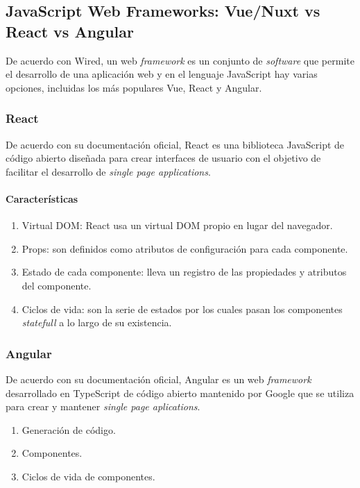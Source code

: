 \subsection{JavaScript Web Frameworks: Vue/Nuxt vs React vs Angular}

De acuerdo con Wired\cite{wired_wired_2020}, un web \textit{framework} es un conjunto de \textit{software} que permite el desarrollo de una aplicación web y en el lenguaje JavaScript hay varias opciones, incluidas los más populares Vue, React y Angular.

\subsubsection*{React}
De acuerdo con su documentación oficial\cite{react_react_2020}, React es una biblioteca JavaScript de código abierto diseñada para crear interfaces de usuario con el objetivo de facilitar el desarrollo de \textit{single page applications}.

\paragraph*{Características}
\begin{enumerate}
    \item Virtual DOM: React usa un virtual DOM propio en lugar del navegador.
    \item Props: son definidos como atributos de configuración para cada componente.
    \item Estado de cada componente: lleva un registro de las propiedades y atributos del componente.
    \item Ciclos de vida: son la serie de estados por los cuales pasan los componentes \textit{statefull} a lo largo de su existencia. 
\end{enumerate}

\subsubsection*{Angular}
De acuerdo con su documentación oficial\cite{angular_angular_2020}, Angular es un web \textit{framework} desarrollado en TypeScript de código abierto mantenido por Google que se utiliza para crear y mantener \textit{single page aplications}. 

\begin{enumerate}
    \item Generación de código.
    \item Componentes.
    \item Ciclos de vida de componentes.
    
\end{enumerate}

